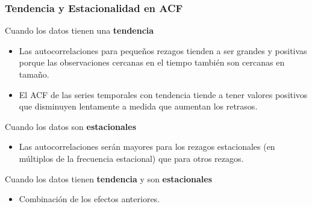 \documentclass[10pt]{beamer}
\begin{document}
\begin{frame}[fragile]
\frametitle{Tendencia y Estacionalidad en ACF}


\begin{block}{Cuando los datos tienen una \textbf{tendencia}}
{\small
\begin{itemize}
\item Las autocorrelaciones para pequeños rezagos tienden a ser grandes y positivas porque las observaciones cercanas en el tiempo también son cercanas en tamaño.

\vspace{3mm}
\item El ACF de las series temporales con tendencia tiende a tener valores positivos que disminuyen lentamente a medida que aumentan los retrasos.

\end{itemize}
}
\end{block}

\pause
\begin{block}{Cuando los datos son \textbf{estacionales}}
{\small
\begin{itemize}
\item Las autocorrelaciones serán mayores para los rezagos estacionales (en múltiplos de la frecuencia estacional) que para otros rezagos.

\end{itemize}
}
\end{block}

\pause

\begin{block}{Cuando los datos tienen \textbf{tendencia} y son \textbf{estacionales}}
{\small
\begin{itemize}
\item Combinación de los efectos anteriores.

\end{itemize}
}
\end{block}



\end{frame}


\end{document}
